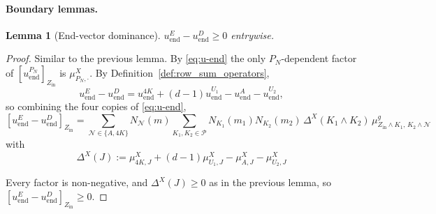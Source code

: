 \documentclass[12pt,a4paper]{article}
\newtheorem{lemma}[theorem]{Lemma}
\begin{document}
\paragraph{Boundary lemmas.}
\begin{lemma}[End-vector dominance]\label{lem:end_lemma_dominance_max_row}
$u_\mathrm{end}^{E} - u_\mathrm{end}^{D} \geq 0$ entrywise.
\end{lemma}
\begin{proof}
Similar to the previous lemma. By \eqref{eq:u-end} the only $P_N$-dependent factor of $[u^{P_N}_\mathrm{end}]_{Z_\mathrm{in}}$ is $\mu^X_{P_N,\cdot}$. By Definition~\ref{def:row_sum_operators},
\[
u_\mathrm{end}^E-u_\mathrm{end}^D=u^{4K}_\mathrm{end}+(d-1)u^{U_1}_\mathrm{end}-u^A_\mathrm{end}-u^{U_2}_\mathrm{end},
\]
so combining the four copies of \eqref{eq:u-end},
\begin{equation}\label{eq:uend-diff}
[u_\mathrm{end}^E - u_\mathrm{end}^D]_{Z_\mathrm{in}}
= \!\!\sum_{\mathcal N\in\{A,4K\}}\!\! N_{\mathcal N}(m)\!\!\sum_{K_1,K_2\in\mathcal{P}}\!\! N_{K_1}(m_1)N_{K_2}(m_2)\,\Delta^X(K_1\wedge K_2)\,\mu^g_{Z_\mathrm{in}\wedge K_1,\,K_2\wedge\mathcal N}
\end{equation}
with $$\Delta^X(J):=\mu^X_{4K,J}+(d-1)\mu^X_{U_1,J}-\mu^X_{A,J}-\mu^X_{U_2,J}$$

Every factor is non-negative, and $\Delta^X(J)\geq 0$ as in the previous lemma, so $[u_\mathrm{end}^E - u_\mathrm{end}^D]_{Z_\mathrm{in}}\geq 0$.



\end{proof}
\end{document}
